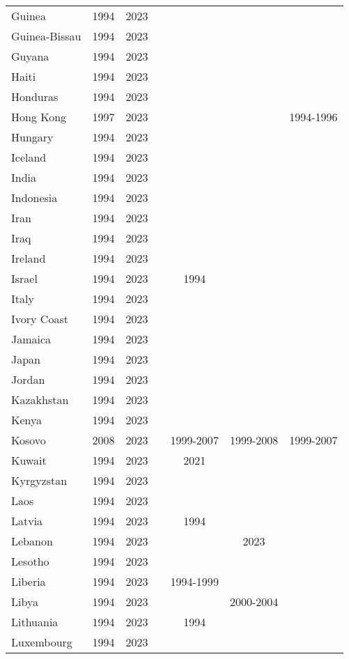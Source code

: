 {\begin{longtable}{lcccccc}
Guinea & 1994 & 2023 &  &  &  & \\
\addlinespace
Guinea-Bissau & 1994 & 2023 &  &  &  & \\
Guyana & 1994 & 2023 &  &  &  & \\
Haiti & 1994 & 2023 &  &  &  & \\
Honduras & 1994 & 2023 &  &  &  & \\
Hong Kong & 1997 & 2023 &  &  &  & 1994-1996\\
\addlinespace
Hungary & 1994 & 2023 &  &  &  & \\
Iceland & 1994 & 2023 &  &  &  & \\
India & 1994 & 2023 &  &  &  & \\
Indonesia & 1994 & 2023 &  &  &  & \\
Iran & 1994 & 2023 &  &  &  & \\
\addlinespace
Iraq & 1994 & 2023 &  &  &  & \\
Ireland & 1994 & 2023 &  &  &  & \\
Israel & 1994 & 2023 &  & 1994 &  & \\
Italy & 1994 & 2023 &  &  &  & \\
Ivory Coast & 1994 & 2023 &  &  &  & \\
\addlinespace
Jamaica & 1994 & 2023 &  &  &  & \\
Japan & 1994 & 2023 &  &  &  & \\
Jordan & 1994 & 2023 &  &  &  & \\
Kazakhstan & 1994 & 2023 &  &  &  & \\
Kenya & 1994 & 2023 &  &  &  & \\
\addlinespace
Kosovo & 2008 & 2023 &  & 1999-2007 & 1999-2008 & 1999-2007\\
Kuwait & 1994 & 2023 &  & 2021 &  & \\
Kyrgyzstan & 1994 & 2023 &  &  &  & \\
Laos & 1994 & 2023 &  &  &  & \\
Latvia & 1994 & 2023 &  & 1994 &  & \\
\addlinespace
Lebanon & 1994 & 2023 &  &  & 2023 & \\
Lesotho & 1994 & 2023 &  &  &  & \\
Liberia & 1994 & 2023 &  & 1994-1999 &  & \\
Libya & 1994 & 2023 &  &  & 2000-2004 & \\
Lithuania & 1994 & 2023 &  & 1994 &  & \\
\addlinespace
Luxembourg & 1994 & 2023 &  &  &  & \\

\end{longtable}}
